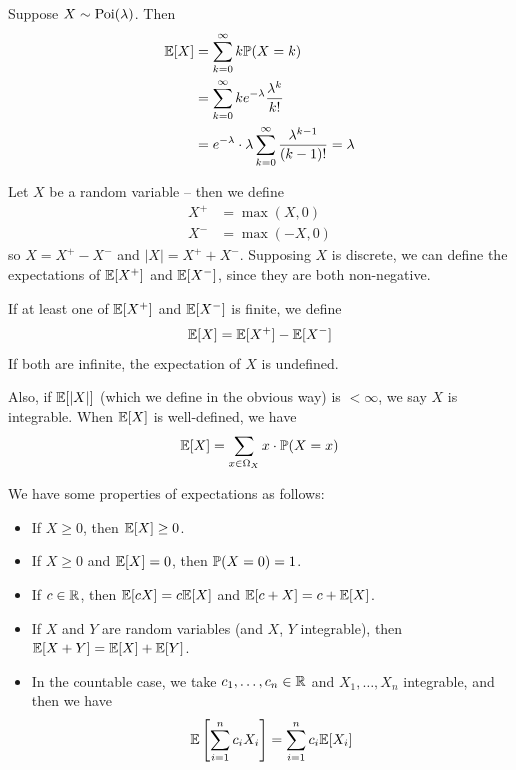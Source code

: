 \documentclass{../template/note}
\begin{document}
    \begin{example}
        Suppose \(X \sim \operatorname{Poi}(\lambda)\). Then
        \begin{align*}
            \mathbb E[X] &= \sum_{k=0}^\infty k \mathbb P(X = k) \\
            &= \sum_{k=0}^\infty ke^{-\lambda}\frac{\lambda^k}{k!} \\
            &= e^{-\lambda} \cdot \lambda \sum_{k=0}^\infty \frac{\lambda^{k-1}}{(k-1)!} = \lambda
        \end{align*}
    \end{example}
    
    Let \(X\) be a random variable -- then we define
    \begin{align*}
        X^+ &= \max(X, 0) \\
        X^- &= \max(-X, 0)
    \end{align*}
    so \(X = X^+ - X^-\) and \(|X| = X^+ + X^-\). Supposing \(X\) is discrete, we can define the expectations of \(\mathbb E[X^+]\) and \(\mathbb E[X^-]\), since they are both non-negative.

    If at least one of \(\mathbb E[X^+]\) and \(\mathbb E[X^-]\) is finite, we define
    \begin{align*}
        \mathbb E[X] = \mathbb E[X^+] - \mathbb E[X^-]
    \end{align*}
    If both are infinite, the expectation of \(X\) is undefined.

    Also, if \(\mathbb E[|X|]\) (which we define in the obvious way) is \(< \infty\), we say \(X\) is integrable. When \(\mathbb E[X]\) is well-defined, we have
    \begin{align*}
        \mathbb E[X] = \sum_{x \in \Omega_X} x \cdot \mathbb P(X = x)
    \end{align*}
    
    We have some properties of expectations as follows:
    \begin{itemize}
        \item If \(X \geq 0\), then \(\mathbb E[X] \geq 0\).
        \item If \(X \geq 0\) and \(\mathbb E[X] = 0\), then \(\mathbb P(X = 0) = 1\).
        \item If \(c \in \mathbb R\), then \(\mathbb E[cX] = c\mathbb E[X]\) and \(\mathbb E[c + X] = c + \mathbb E[X]\).
        \item If \(X\) and \(Y\) are random variables (and \(X\), \(Y\) integrable), then \(\mathbb E[X + Y] = \mathbb E[X] + \mathbb E[Y]\).
        \item In the countable case, we take \(c_1, \dots, c_n \in \mathbb R\) and \(X_1, \dots, X_n\) integrable, and then we have
        \begin{align*}
            \mathbb E\left[\sum_{i=1}^n c_i X_i\right] = \sum_{i=1}^n c_i \mathbb E[X_i]
        \end{align*}
    \end{itemize}
    
\end{document}

